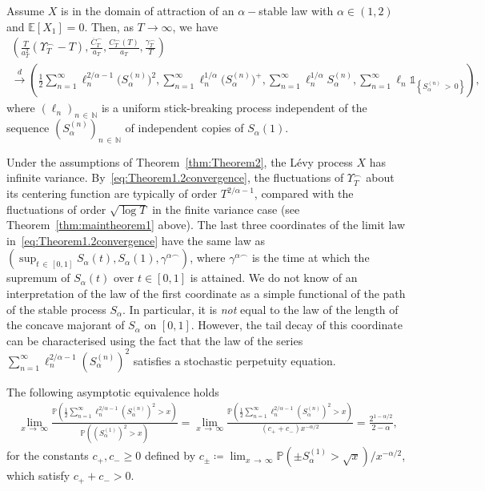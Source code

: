 \documentclass[AHL,Unicode,longabstracts,published]{cedram}
\newcommand\N{\mathbb{N}}
\newcommand\E{\mathds{E}}
\newcommand\p{\mathds{P}}
\newcommand\1{\mathds{1}}
\newcommand\cid{\xrightarrow{d}}
\newcommand\ov[1]{\overline{#1}}
\begin{document}
\begin{theo}\label{thm:Theorem2}
Assume $X$ is in the domain of attraction of an $\alpha-$stable law with $\alpha\in(1,2)$ and $\E[X_1]=0$. Then, as $T\to\infty$, we have
\begin{equation}\label{eq:Theorem1.2convergence}
\begin{multlined}
\left(\frac{T}{a_T^2}
\left(\Upsilon_T^{\frown}-T \right),
\frac{\ov{C}^\frown_T}{a_T},
\frac{C_T^\frown(T)}{a_T},\frac{\gamma_T^\frown}{T}
\right)\\
\cid\left(\frac{1}{2}\sum_{n=1}^\infty
\ell_n^{2/\alpha-1}\big(S_\alpha^{(n)}\big)^2,
\sum_{n=1}^\infty \ell_n^{1/\alpha}
\big(S_\alpha^{(n)}\big)^+,
\sum_{n=1}^\infty\ell_n^{1/\alpha}S_\alpha^{(n)},
\sum_{n=1}^\infty\ell_n
\1_{\left\{S_\alpha^{(n)}\,>\,0\right\}}
\right),
\end{multlined}
\end{equation}
where $(\ell_n)_{n\,\in\,\N}$ is a uniform stick-breaking process independent of the sequence $(S_\alpha^{(n)})_{n\,\in\,\N}$ of independent copies of $S_\alpha(1)$.
\end{theo}

Under the assumptions of Theorem~\ref{thm:Theorem2}, the Lévy process $X$ has infinite variance. By~\eqref{eq:Theorem1.2convergence}, the fluctuations of $\Upsilon_T^\frown$ about its centering function are typically of order $T^{2/\alpha-1}$, compared with the fluctuations of order $\sqrt{\log T}$ in the finite variance case (see Theorem~\ref{thm:maintheorem1} above). The last three coordinates of the limit law in~\eqref{eq:Theorem1.2convergence} have the same law as $(\sup_{t\,\in\,[0,1]}S_\alpha(t),S_\alpha(1),\gamma^{\alpha\frown})$, where $\gamma^{\alpha\frown}$ is the time at which the supremum of $S_\alpha(t)$ over $t\in[0,1]$ is attained. We do not know of an interpretation of the law of the first coordinate as a simple functional of the path of the stable process $S_\alpha$. In particular, it is \emph{not} equal to the law of the length of the concave majorant of $S_\alpha$ on $[0,1]$. However, the tail decay of this coordinate can be characterised using the fact that the law of the series $\sum_{n=1}^\infty \ell_n^{2/\alpha-1}(S_\alpha^{(n)})^2$ satisfies a stochastic perpetuity equation.

\begin{prop}\label{prop:tailbehaviour}
The following asymptotic equivalence holds
\begin{align*}
\lim_{x\,\to\,\infty}\frac{\p\left(\frac{1}{2}\sum\limits_{n=1}^\infty
\ell_n^{2/\alpha-1}\left(S_\alpha^{(n)}\right)^2>x\right)}{\p\left(\left(S_\alpha^{(1)}\right)^2>x\right)} =\lim_{x\,\to\,\infty}\frac{\p\left(\frac{1}{2}\sum\limits_{n=1}^\infty
\ell_n^{2/\alpha-1}\left(S_\alpha^{(n)}\right)^2>x\right)}{\left(c_+ + c_-\right)x^{-\alpha/2}} =\frac{2^{1-\alpha/2}}{2-\alpha},
\end{align*}
for the constants $c_+,c_-\ge 0$ defined by $c_\pm\coloneqq \lim_{x\,\to\,\infty}\p(\pm S_\alpha^{(1)}>\sqrt{x})/x^{-\alpha/2}$, which satisfy $c_++c_->0$.
\end{prop}
\end{document}
